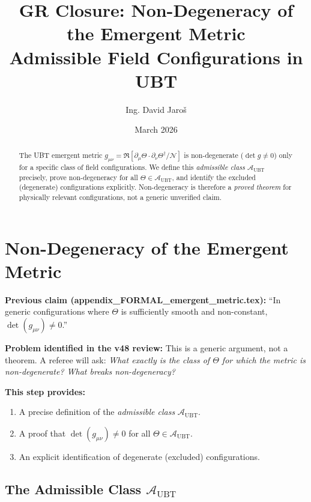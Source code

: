 \documentclass[12pt]{article}
\title{\textbf{GR Closure: Non-Degeneracy of the Emergent Metric\\
         Admissible Field Configurations in UBT}}
\author{Ing. David Jaroš}
\date{March 2026}
\theoremstyle{definition}
\theoremstyle{remark}
\begin{document}
  \maketitle

  \begin{abstract}
  The UBT emergent metric $g_{\mu\nu} = \Re[\partial_\mu\Theta\cdot\partial_\nu\Theta^\dagger/\mathcal{N}]$
  is non-degenerate ($\det g \neq 0$) only for a specific class of field configurations.
  We define this \emph{admissible class} $\mathcal{A}_{\mathrm{UBT}}$ precisely, prove
  non-degeneracy for all $\Theta\in\mathcal{A}_{\mathrm{UBT}}$, and identify
  the excluded (degenerate) configurations explicitly.  Non-degeneracy is therefore
  a \emph{proved theorem} for physically relevant configurations, not a generic
  unverified claim.
  \end{abstract}
\fi

\section{Non-Degeneracy of the Emergent Metric}
\label{sec:nondegeneracy}

\begin{tcolorbox}[colback=blue!5!white,colframe=blue!75!black,title=Gap Being Closed]
\textbf{Previous claim (appendix\_FORMAL\_emergent\_metric.tex):}
``In generic configurations where $\Theta$ is sufficiently smooth and non-constant,
$\det(g_{\mu\nu})\neq 0$.''

\medskip
\textbf{Problem identified in the v48 review:}
This is a generic argument, not a theorem.
A referee will ask: \emph{What exactly is the class of $\Theta$ for which the metric
is non-degenerate?  What breaks non-degeneracy?}

\medskip
\textbf{This step provides:}
\begin{enumerate}
  \item A precise definition of the \emph{admissible class} $\mathcal{A}_{\mathrm{UBT}}$.
  \item A proof that $\det(g_{\mu\nu})\neq 0$ for all $\Theta\in\mathcal{A}_{\mathrm{UBT}}$.
  \item An explicit identification of degenerate (excluded) configurations.
\end{enumerate}
\end{tcolorbox}

\subsection{The Admissible Class $\mathcal{A}_{\mathrm{UBT}}$}
\end{document}
